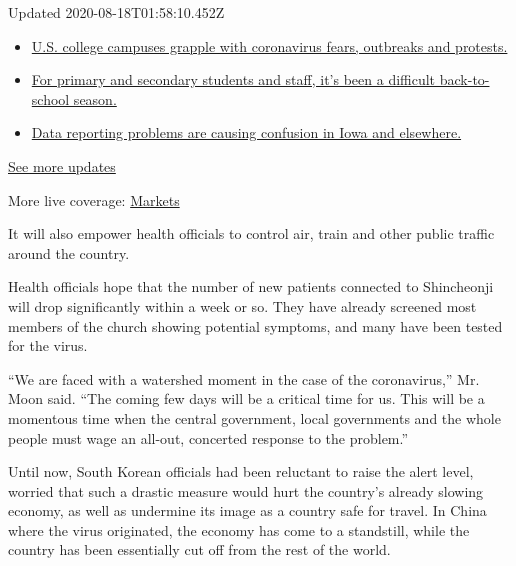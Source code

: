 Updated 2020-08-18T01:58:10.452Z

\begin{itemize}
\tightlist
\item
  \href{https://www.nytimes.com/2020/08/17/world/coronavirus-covid.html?action=click\&pgtype=Article\&state=default\&region=MAIN_CONTENT_1\&context=storylines_live_updates\#link-6fdbc8ef}{U.S.
  college campuses grapple with coronavirus fears, outbreaks and
  protests.}
\item
  \href{https://www.nytimes.com/2020/08/17/world/coronavirus-covid.html?action=click\&pgtype=Article\&state=default\&region=MAIN_CONTENT_1\&context=storylines_live_updates\#link-12d68713}{For
  primary and secondary students and staff, it's been a difficult
  back-to-school season.}
\item
  \href{https://www.nytimes.com/2020/08/17/world/coronavirus-covid.html?action=click\&pgtype=Article\&state=default\&region=MAIN_CONTENT_1\&context=storylines_live_updates\#link-6aa8318c}{Data
  reporting problems are causing confusion in Iowa and elsewhere.}
\end{itemize}

\href{https://www.nytimes.com/2020/08/17/world/coronavirus-covid.html?action=click\&pgtype=Article\&state=default\&region=MAIN_CONTENT_1\&context=storylines_live_updates}{See
more updates}

More live coverage:
\href{https://www.nytimes.com/live/2020/08/17/business/stock-market-today-coronavirus?action=click\&pgtype=Article\&state=default\&region=MAIN_CONTENT_1\&context=storylines_live_updates}{Markets}

It will also empower health officials to control air, train and other
public traffic around the country.

Health officials hope that the number of new patients connected to
Shincheonji will drop significantly within a week or so. They have
already screened most members of the church showing potential symptoms,
and many have been tested for the virus.

``We are faced with a watershed moment in the case of the coronavirus,''
Mr. Moon said. ``The coming few days will be a critical time for us.
This will be a momentous time when the central government, local
governments and the whole people must wage an all-out, concerted
response to the problem.''

Until now, South Korean officials had been reluctant to raise the alert
level, worried that such a drastic measure would hurt the country's
already slowing economy, as well as undermine its image as a country
safe for travel. In China where the virus originated, the economy has
come to a standstill, while the country has been essentially cut off
from the rest of the world.

